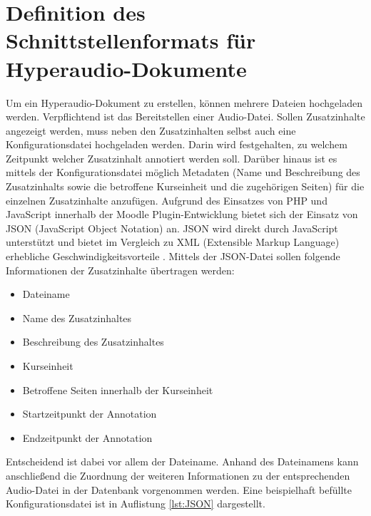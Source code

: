 \section{Definition des Schnittstellenformats für Hyperaudio-Dokumente}
\label{sec:konfigurationsdatei}
Um ein Hyperaudio-Dokument zu erstellen, können mehrere Dateien hochgeladen werden. Verpflichtend ist das Bereitstellen einer Audio-Datei. Sollen Zusatzinhalte angezeigt werden, muss neben den Zusatzinhalten selbst auch eine Konfigurationsdatei hochgeladen werden. Darin wird festgehalten, zu welchem Zeitpunkt welcher Zusatzinhalt annotiert werden soll. Darüber hinaus ist es mittels der Konfigurationsdatei möglich Metadaten (Name und Beschreibung des Zusatzinhalts sowie die betroffene Kurseinheit und die zugehörigen Seiten) für die einzelnen Zusatzinhalte anzufügen.
Aufgrund des Einsatzes von PHP und JavaScript innerhalb der Moodle Plugin-Entwicklung bietet sich der Einsatz von JSON (JavaScript Object Notation) an. JSON wird direkt durch JavaScript unterstützt und bietet im Vergleich zu XML (Extensible Markup Language) erhebliche Geschwindigkeitsvorteile \citep{nurseitov2009comparison}.
Mittels der JSON-Datei sollen folgende Informationen der Zusatzinhalte übertragen werden:

\begin{itemize}
\item Dateiname
\item Name des Zusatzinhaltes
\item Beschreibung des Zusatzinhaltes
\item Kurseinheit
\item Betroffene Seiten innerhalb der Kurseinheit
\item Startzeitpunkt der Annotation
\item Endzeitpunkt der Annotation
\end{itemize}


Entscheidend ist dabei vor allem der Dateiname. Anhand des Dateinamens kann anschließend die Zuordnung der weiteren Informationen zu der entsprechenden Audio-Datei in der Datenbank vorgenommen werden. Eine beispielhaft befüllte Konfigurationsdatei ist in Auflistung \ref{lst:JSON} dargestellt.


